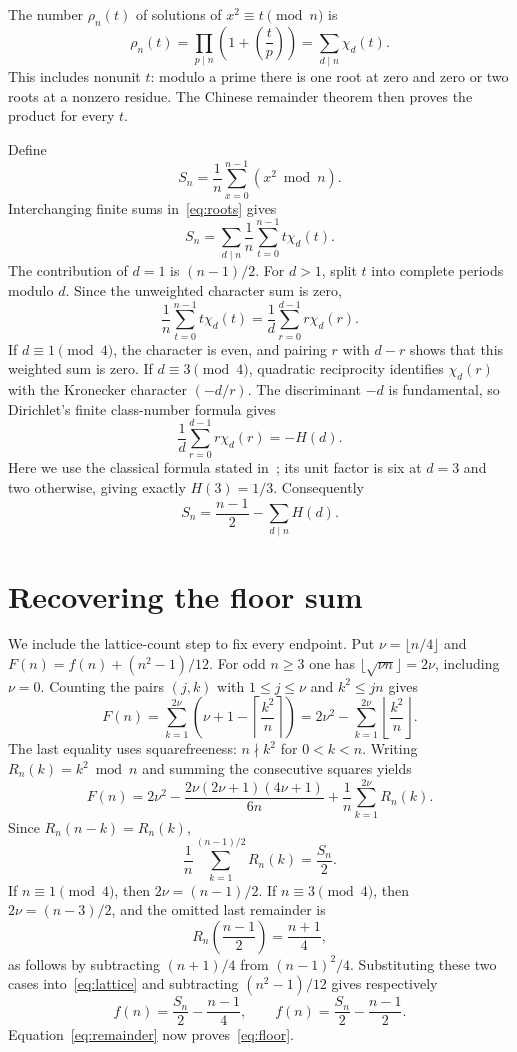 \documentclass[11pt]{article}
\newcommand{\fl}[1]{\left\lfloor#1\right\rfloor}
\begin{document}
The number $\rho_n(t)$ of solutions of $x^2\equiv t\pmod n$ is
\begin{equation}\label{eq:roots}
 \rho_n(t)=\prod_{p\mid n}\left(1+\left(\frac tp\right)\right)
         =\sum_{d\mid n}\chi_d(t).
\end{equation}
This includes nonunit $t$: modulo a prime there is one root at zero
and zero or two roots at a nonzero residue. The Chinese remainder
theorem then proves the product for every $t$.

Define
\[
 S_n=\frac1n\sum_{x=0}^{n-1}(x^2\bmod n).
\]
Interchanging finite sums in~\eqref{eq:roots} gives
\[
 S_n=\sum_{d\mid n}\frac1n\sum_{t=0}^{n-1}t\chi_d(t).
\]
The contribution of $d=1$ is $(n-1)/2$. For $d>1$, split $t$ into
complete periods modulo $d$. Since the unweighted character sum is zero,
\[
 \frac1n\sum_{t=0}^{n-1}t\chi_d(t)
 =\frac1d\sum_{r=0}^{d-1}r\chi_d(r).
\]
If $d\equiv1\pmod4$, the character is even, and pairing $r$ with
$d-r$ shows that this weighted sum is zero. If $d\equiv3\pmod4$,
quadratic reciprocity identifies $\chi_d(r)$ with the Kronecker
character $(-d/r)$. The discriminant $-d$ is fundamental, so
Dirichlet's finite class-number formula gives
\[
 \frac1d\sum_{r=0}^{d-1}r\chi_d(r)=-H(d).
\]
Here we use the classical formula stated in~\cite[Theorem 4.1]{CD};
its unit factor is six at $d=3$ and two otherwise, giving exactly
$H(3)=1/3$. Consequently
\begin{equation}\label{eq:remainder}
 S_n=\frac{n-1}{2}-\sum_{d\mid n}H(d).
\end{equation}

\section*{Recovering the floor sum}
We include the lattice-count step to fix every endpoint. Put
$\nu=\lfloor n/4\rfloor$ and
$F(n)=f(n)+(n^2-1)/12$. For odd $n\ge3$ one has
$\lfloor\sqrt{\nu n}\rfloor=2\nu$, including $\nu=0$.
Counting the pairs $(j,k)$ with $1\le j\le\nu$ and $k^2\le jn$ gives
\[
 F(n)=\sum_{k=1}^{2\nu}
       \left(\nu+1-\left\lceil\frac{k^2}{n}\right\rceil\right)
     =2\nu^2-\sum_{k=1}^{2\nu}\fl{\frac{k^2}{n}}.
\]
The last equality uses squarefreeness: $n\nmid k^2$ for $0<k<n$.
Writing $R_n(k)=k^2\bmod n$ and summing the consecutive squares yields
\begin{equation}\label{eq:lattice}
 F(n)=2\nu^2-\frac{2\nu(2\nu+1)(4\nu+1)}{6n}
             +\frac1n\sum_{k=1}^{2\nu}R_n(k).
\end{equation}
Since $R_n(n-k)=R_n(k)$,
\[
 \frac1n\sum_{k=1}^{(n-1)/2}R_n(k)=\frac{S_n}{2}.
\]
If $n\equiv1\pmod4$, then $2\nu=(n-1)/2$. If $n\equiv3\pmod4$,
then $2\nu=(n-3)/2$, and the omitted last remainder is
\[
 R_n\left(\frac{n-1}{2}\right)=\frac{n+1}{4},
\]
as follows by subtracting $(n+1)/4$ from $(n-1)^2/4$.
Substituting these two cases into~\eqref{eq:lattice} and subtracting
$(n^2-1)/12$ gives respectively
\[
 f(n)=\frac{S_n}{2}-\frac{n-1}{4},
 \qquad
 f(n)=\frac{S_n}{2}-\frac{n-1}{2}.
\]
Equation~\eqref{eq:remainder} now proves~\eqref{eq:floor}.
\end{document}
